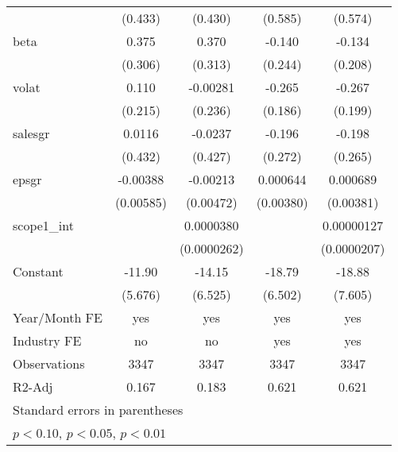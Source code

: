 \begin{table}[htbp]
\begin{tabular}{l*{4}{c}}
                    &     (0.433)         &     (0.430)         &     (0.585)         &     (0.574)         \\
[1em]
beta                &       0.375         &       0.370         &      -0.140         &      -0.134         \\
                    &     (0.306)         &     (0.313)         &     (0.244)         &     (0.208)         \\
[1em]
volat               &       0.110         &    -0.00281         &      -0.265         &      -0.267         \\
                    &     (0.215)         &     (0.236)         &     (0.186)         &     (0.199)         \\
[1em]
salesgr             &      0.0116         &     -0.0237         &      -0.196         &      -0.198         \\
                    &     (0.432)         &     (0.427)         &     (0.272)         &     (0.265)         \\
[1em]
epsgr               &    -0.00388         &    -0.00213         &    0.000644         &    0.000689         \\
                    &   (0.00585)         &   (0.00472)         &   (0.00380)         &   (0.00381)         \\
[1em]
scope1\_int          &                     &   0.0000380         &                     &  0.00000127         \\
                    &                     & (0.0000262)         &                     & (0.0000207)         \\
[1em]
Constant            &      -11.90\sym{**} &      -14.15\sym{**} &      -18.79\sym{***}&      -18.88\sym{**} \\
                    &     (5.676)         &     (6.525)         &     (6.502)         &     (7.605)         \\
\hline
Year/Month FE       &         yes         &         yes         &         yes         &         yes         \\
Industry FE         &          no         &          no         &         yes         &         yes         \\
Observations        &        3347         &        3347         &        3347         &        3347         \\
R2-Adj              &       0.167         &       0.183         &       0.621         &       0.621         \\
\hline\hline
\multicolumn{5}{l}{\footnotesize Standard errors in parentheses}\\
\multicolumn{5}{l}{\footnotesize \sym{*} \(p<0.10\), \sym{**} \(p<0.05\), \sym{***} \(p<0.01\)}\\
\end{tabular}
\end{table}
